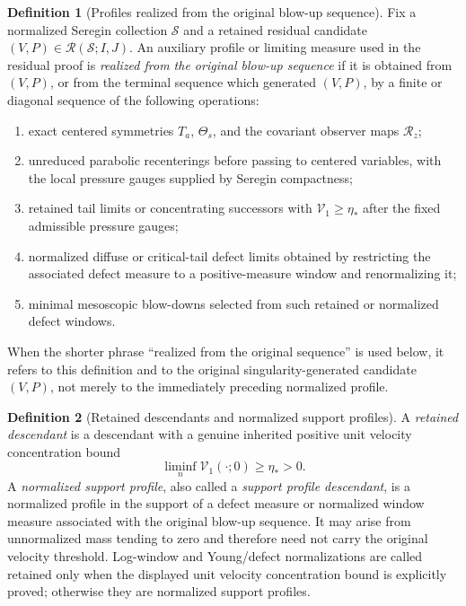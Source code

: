 \documentclass[11pt]{amsart}
\numberwithin{equation}{section}
\theoremstyle{plain}
\theoremstyle{definition}
\newtheorem{definition}[definition]{Definition}
\theoremstyle{remark}
\newcommand{\calS}{\mathcal S}
\newcommand{\calR}{\mathcal R}
\newcommand{\Vel}{\mathcal V}
\begin{document}
\begin{definition}[Profiles realized from the original blow-up sequence]
\label{def:sequence-realized-residual-object}
Fix a normalized Seregin collection \(\calS\) and a retained residual candidate
\((V,P)\in\calR(\calS;I,J)\).  An auxiliary profile or limiting measure used in the residual proof is
\emph{realized from the original blow-up sequence} if it is obtained from \((V,P)\), or from the terminal
sequence which generated \((V,P)\), by a finite or diagonal sequence of the
following operations:
\begin{enumerate}[label=\textup{(\roman*)}]
   \item exact centered symmetries \(T_a\), \(\Theta_s\), and the covariant
   observer maps \(\calR_z\);
   \item unreduced parabolic recenterings before passing to centered variables, with
   the local pressure gauges supplied by Seregin compactness;
   \item retained tail limits or concentrating successors with
   \(\Vel_1\ge\eta_*\) after the fixed admissible pressure gauges;
   \item normalized diffuse or critical-tail defect limits obtained by
   restricting the associated defect measure to a positive-measure window and
   renormalizing it;
   \item minimal mesoscopic blow-downs selected from such retained or
   normalized defect windows.
\end{enumerate}
When the shorter phrase ``realized from the original sequence'' is used below,
it refers to this definition and to the original singularity-generated
candidate \((V,P)\), not merely to the immediately preceding normalized profile.
\end{definition}

\begin{definition}[Retained descendants and normalized support profiles]
\label{def:retained-vs-support-profile-descendant}
A \emph{retained descendant} is a descendant with a genuine inherited positive
unit velocity concentration bound
\[
   \liminf_n\Vel_1(\cdot;0)\ge\eta_*>0 .
\]
A \emph{normalized support profile}, also called a \emph{support profile
descendant}, is a normalized profile in the support of a defect measure or
normalized window measure associated with the original blow-up sequence.  It may arise from
unnormalized mass tending to zero and therefore need not carry the original
velocity threshold.  Log-window and Young/defect normalizations are called
retained only when the displayed unit velocity concentration bound is explicitly proved;
otherwise they are normalized support profiles.
\end{definition}
\end{document}
